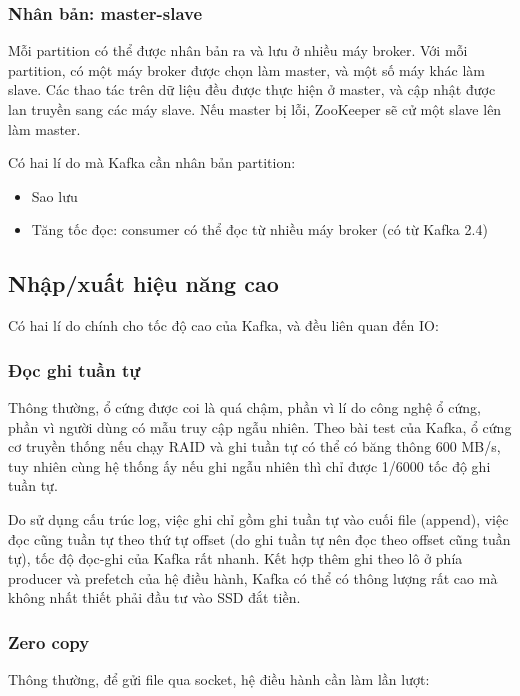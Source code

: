 \documentclass{article}
\begin{document}
\subsubsection{Nhân bản: master-slave}

Mỗi partition có thể được nhân bản ra và lưu ở nhiều máy broker. Với mỗi
partition, có một máy broker được chọn làm master, và một số máy khác làm slave.
Các thao tác trên dữ liệu đều được thực hiện ở master, và cập nhật được lan
truyền sang các máy slave. Nếu master bị lỗi, ZooKeeper sẽ cử một slave lên làm
master.

Có hai lí do mà Kafka cần nhân bản partition:

\begin{itemize}
    \item Sao lưu
    \item Tăng tốc đọc: consumer có thể đọc từ nhiều máy broker (có từ Kafka
        2.4)
\end{itemize}

\subsection{Nhập/xuất hiệu năng cao}

Có hai lí do chính cho tốc độ cao của Kafka, và đều liên quan đến IO:

\subsubsection{Đọc ghi tuần tự}

Thông thường, ổ cứng được coi là quá chậm, phần vì lí do công nghệ ổ cứng, phần
vì người dùng có mẫu truy cập ngẫu nhiên. Theo bài test của Kafka, ổ cứng cơ
truyền thống nếu chạy RAID và ghi tuần tự có thể có băng thông 600 MB/s, tuy
nhiên cùng hệ thống ấy nếu ghi ngẫu nhiên thì chỉ được 1/6000 tốc độ ghi tuần
tự.

Do sử dụng cấu trúc log, việc ghi chỉ gồm ghi tuần tự vào cuối file (append),
việc đọc cũng tuần tự theo thứ tự offset (do ghi tuần tự nên đọc theo offset
cũng tuần tự), tốc độ đọc-ghi của Kafka rất nhanh. Kết hợp thêm ghi theo lô ở
phía producer và prefetch của hệ điều hành, Kafka có thể có thông lượng rất cao
mà không nhất thiết phải đầu tư vào SSD đắt tiền.

\subsubsection{Zero copy}

Thông thường, để gửi file qua socket, hệ điều hành cần làm lần lượt:
\end{document}

